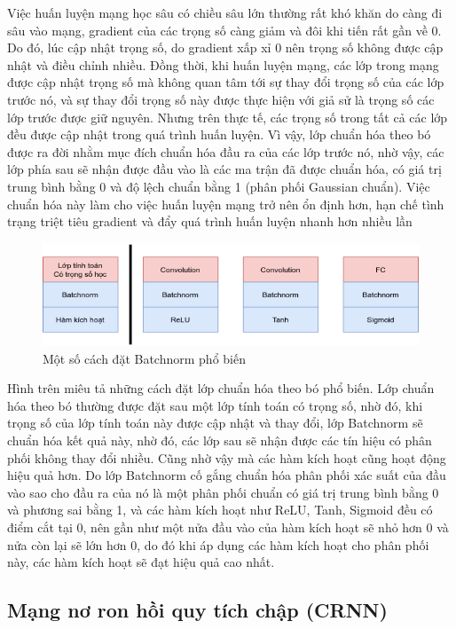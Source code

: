 Việc huấn luyện mạng học sâu có chiều sâu lớn thường rất khó khăn do càng đi sâu vào mạng, gradient của các trọng số càng giảm và đôi khi tiến rất gần về 0. Do đó, lúc cập nhật trọng số, do gradient xấp xỉ 0 nên trọng số không được cập nhật và điều chỉnh nhiều. Đồng thời, khi huấn luyện mạng, các lớp trong mạng được cập nhật trọng số mà không quan tâm tới sự thay đổi trọng số của các lớp trước nó, và sự thay đổi trọng số này được thực hiện với giả sử là trọng số các lớp trước được giữ nguyên. Nhưng trên thực tế, các trọng số trong tất cả các lớp đều được cập nhật trong quá trình huấn luyện. Vì vậy, lớp chuẩn hóa theo bó được ra đời nhằm mục đích chuẩn hóa đầu ra của các lớp trước nó, nhờ vậy, các lớp phía sau sẽ nhận được đầu vào là các ma trận đã được chuẩn hóa, có giá trị trung bình bằng 0 và độ lệch chuẩn bằng 1 (phân phối Gaussian chuẩn). Việc chuẩn hóa này làm cho việc huấn luyện mạng trở nên ổn định hơn, hạn chế tình trạng triệt tiêu gradient và đẩy quá trình huấn luyện nhanh hơn nhiều lần

\begin{figure}[H]
    \centering
    \includegraphics[width=13cm]{./content/materials/batchnorm.png}
    \caption{Một số cách đặt Batchnorm phổ biến}
\end{figure}

Hình trên miêu tả những cách đặt lớp chuẩn hóa theo bó phổ biến. Lớp chuẩn hóa theo bó thường được đặt sau một lớp tính toán có trọng số, nhờ đó, khi trọng số của lớp tính toán này được cập nhật và thay đổi, lớp Batchnorm sẽ chuẩn hóa kết quả này, nhờ đó, các lớp sau sẽ nhận được các tín hiệu có phân phối không thay đổi nhiều. Cũng nhờ vậy mà các hàm kích hoạt cũng hoạt động hiệu quả hơn. Do lớp Batchnorm cố gắng chuẩn hóa phân phối xác suất của đầu vào sao cho đầu ra của nó là một phân phối chuẩn có giá trị trung bình bằng 0 và phương sai bằng 1, và các hàm kích hoạt như ReLU, Tanh, Sigmoid đều có điểm cắt tại 0, nên gần như một nửa đầu vào của hàm kích hoạt sẽ nhỏ hơn 0 và nửa còn lại sẽ lớn hơn 0, do đó khi áp dụng các hàm kích hoạt cho phân phối này, các hàm kích hoạt sẽ đạt hiệu quả cao nhất.

\subsection{Mạng nơ ron hồi quy tích chập (CRNN)}

